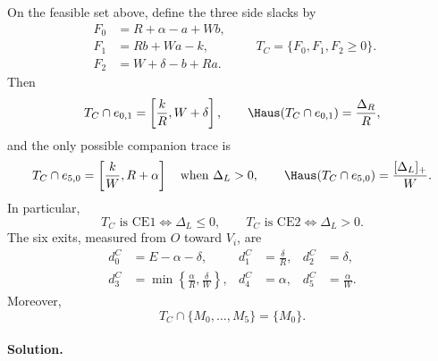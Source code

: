 \begin{proposition}
\label{prop:app-signed-center-optimization}
\label{prop:signed-center-normal-form}
On the feasible set above, define the three side slacks by
\begin{equation}
 \begin{aligned}
 F_0&=R+\alpha-a+Wb,\\
 F_1&=Rb+Wa-k,\\
 F_2&=W+\delta-b+Ra.
 \end{aligned}
 \qquad
 T_C=\{F_0,F_1,F_2\ge0\}.
 \label{eq:signed-side-slacks}
\end{equation}
Then
\begin{equation}
 T_C\cap e_{0,1}
 =\left[\frac{k}{R},W+\delta\right],
 \qquad
 \Haus(T_C\cap e_{0,1})=\frac{\Delta_R}{R},
 \label{eq:signed-right-trace}
\end{equation}
and the only possible companion trace is
\begin{equation}
 T_C\cap e_{5,0}
 =\left[\frac{k}{W},R+\alpha\right]
 \quad\text{when }\Delta_L>0,
 \qquad
 \Haus(T_C\cap e_{5,0})=\frac{[\Delta_L]_+}{W}.
 \label{eq:signed-left-trace}
\end{equation}
In particular,
\begin{equation}
 T_C\text{ is CE1}\iff\Delta_L\le0,
 \qquad
 T_C\text{ is CE2}\iff\Delta_L>0.
 \label{eq:signed-classification}
\end{equation}
The six exits, measured from $O$ toward $V_i$, are
\begin{equation}
 \begin{aligned}
 d_0^C&=E-\alpha-\delta,&
 d_1^C&=\frac{\delta}{R},&
 d_2^C&=\delta,\\
 d_3^C&=\min\left\{\frac{\alpha}{R},\frac{\delta}{W}\right\},&
 d_4^C&=\alpha,&
 d_5^C&=\frac{\alpha}{W}.
 \end{aligned}
 \label{eq:signed-center-exits}
\end{equation}
Moreover,
\begin{equation}
 T_C\cap\{M_0,\ldots,M_5\}=\{M_0\}.
 \label{eq:signed-unique-center-midpoint}
\end{equation}
\end{proposition}

\paragraph{Solution.}

